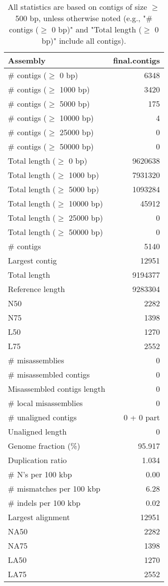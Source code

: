 \documentclass[12pt,a4paper]{article}
\begin{document}
\begin{table}[ht]
\begin{center}
\caption{All statistics are based on contigs of size $\geq$ 500 bp, unless otherwise noted (e.g., "\# contigs ($\geq$ 0 bp)" and "Total length ($\geq$ 0 bp)" include all contigs).}
\begin{tabular}{|l*{1}{|r}|}
\hline
Assembly & final.contigs \\ \hline
\# contigs ($\geq$ 0 bp) & 6348 \\ \hline
\# contigs ($\geq$ 1000 bp) & 3420 \\ \hline
\# contigs ($\geq$ 5000 bp) & 175 \\ \hline
\# contigs ($\geq$ 10000 bp) & 4 \\ \hline
\# contigs ($\geq$ 25000 bp) & 0 \\ \hline
\# contigs ($\geq$ 50000 bp) & 0 \\ \hline
Total length ($\geq$ 0 bp) & 9620638 \\ \hline
Total length ($\geq$ 1000 bp) & 7931320 \\ \hline
Total length ($\geq$ 5000 bp) & 1093284 \\ \hline
Total length ($\geq$ 10000 bp) & 45912 \\ \hline
Total length ($\geq$ 25000 bp) & 0 \\ \hline
Total length ($\geq$ 50000 bp) & 0 \\ \hline
\# contigs & 5140 \\ \hline
Largest contig & 12951 \\ \hline
Total length & 9194377 \\ \hline
Reference length & 9283304 \\ \hline
N50 & 2282 \\ \hline
N75 & 1398 \\ \hline
L50 & 1270 \\ \hline
L75 & 2552 \\ \hline
\# misassemblies & 0 \\ \hline
\# misassembled contigs & 0 \\ \hline
Misassembled contigs length & 0 \\ \hline
\# local misassemblies & 0 \\ \hline
\# unaligned contigs & 0 + 0 part \\ \hline
Unaligned length & 0 \\ \hline
Genome fraction (\%) & 95.917 \\ \hline
Duplication ratio & 1.034 \\ \hline
\# N's per 100 kbp & 0.00 \\ \hline
\# mismatches per 100 kbp & 6.28 \\ \hline
\# indels per 100 kbp & 0.02 \\ \hline
Largest alignment & 12951 \\ \hline
NA50 & 2282 \\ \hline
NA75 & 1398 \\ \hline
LA50 & 1270 \\ \hline
LA75 & 2552 \\ \hline
\end{tabular}
\end{center}
\end{table}
\end{document}

